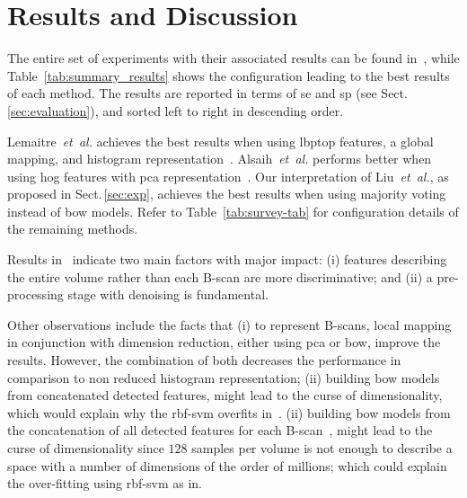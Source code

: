 \section{Results and Discussion}\label{sec:results}\label{sec:discussion}

The entire set of experiments with their associated results can be found in~\cite{rethinopaty20016apr-repoICPR}, while Table~\ref{tab:summary_results} shows the configuration leading to the best results of each method.
The results are reported in terms of \gls{se} and \gls{sp} (see Sect.\,\ref{sec:evaluation}), and sorted left to right in descending order.

Lemaitre~\emph{et~al.} achieves the best results when using \gls{lbptop} features, a global mapping, and histogram representation~\cite{Lemaintre2015miccaiOCT}.
Alsaih~\emph{et~al.} performs better when using \gls{hog} features with \gls{pca} representation~\cite{Alsaih2016apr-repoICPR}.
Our interpretation of Liu~\emph{et~al.}, as proposed in Sect.\,\ref{sec:exp}, achieves the best results when using majority voting instead of \gls{bow} models.
Refer to Table~\ref{tab:survey-tab} for configuration details of the remaining methods.

Results in~\cite{rethinopaty20016apr-repoICPR} indicate two main factors with major impact:
(i) features describing the entire volume rather than each B-scan are more discriminative; and
(ii) a pre-processing stage with denoising is fundamental.

Other observations include the facts that
(i) to represent B-scans, local mapping in conjunction with dimension reduction, either using \gls{pca} or \gls{bow}, improve the results.
However, the combination of both decreases the performance in comparison to non reduced histogram representation;
(ii) building \gls{bow} models from concatenated detected features, might lead to the curse of dimensionality, which would explain why the \gls{rbf}-\gls{svm} overfits in~\cite{liu20016apr-repoICPR}.
(ii) building \gls{bow} models from the concatenation of all detected features for each B-scan~\cite{liu20016apr-repoICPR}, might lead to the curse of dimensionality since $128$ samples per volume is not enough to describe a space with a number of dimensions of the order of millions; which could explain the over-fitting using \gls{rbf}-\gls{svm} as in.
